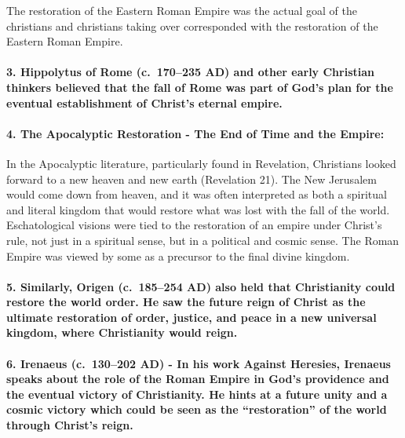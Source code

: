 The restoration of the Eastern Roman Empire was the actual goal of the christians and christians taking over corresponded with the restoration of the Eastern Roman Empire.

\paragraph{3.
Hippolytus of Rome (c.~170--235 AD) and other early Christian thinkers believed that the fall of Rome was part of God's plan for the eventual establishment of Christ's eternal empire.}\label{par:hippolytus-of-rome-c.-170235-ad-and-other-early-christian-thinkers-believed-that-the-fall-of-rome-was-part-of-gods-plan-for-the-eventual-establishment-of-christs-eternal-empire.}

\paragraph{4.
The Apocalyptic Restoration - The End of Time and the Empire:}\label{par:the-apocalyptic-restoration---the-end-of-time-and-the-empire}

In the Apocalyptic literature, particularly found in Revelation, Christians looked forward to a new heaven and new earth (Revelation 21).
The New Jerusalem would come down from heaven, and it was often interpreted as both a spiritual and literal kingdom that would restore what was lost with the fall of the world.
Eschatological visions were tied to the restoration of an empire under Christ's rule, not just in a spiritual sense, but in a political and cosmic sense.
The Roman Empire was viewed by some as a precursor to the final divine kingdom.

\paragraph{5.
Similarly, Origen (c.~185--254 AD) also held that Christianity could restore the world order.
He saw the future reign of Christ as the ultimate restoration of order, justice, and peace in a new universal kingdom, where Christianity would reign.}\label{par:similarly-origen-c.-185254-ad-also-held-that-christianity-could-restore-the-world-order.-he-saw-the-future-reign-of-christ-as-the-ultimate-restoration-of-order-justice-and-peace-in-a-new-universal-kingdom-where-christianity-would-reign.}

\paragraph{6.
Irenaeus (c.~130--202 AD) - In his work Against Heresies, Irenaeus speaks about the role of the Roman Empire in God's providence and the eventual victory of Christianity.
He hints at a future unity and a cosmic victory which could be seen as the ``restoration'' of the world through Christ's reign.}\label{par:irenaeus-c.-130202-ad---in-his-work-against-heresies-irenaeus-speaks-about-the-role-of-the-roman-empire-in-gods-providence-and-the-eventual-victory-of-christianity.-he-hints-at-a-future-unity-and-a-cosmic-victory-which-could-be-seen-as-the-restoration-of-the-world-through-christs-reign.}

